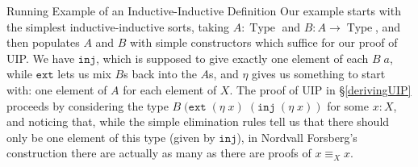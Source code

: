 \documentclass[runningheads]{llncs}
\newcommand{\erase}[1]{{}}
\DeclareMathOperator{\USet}{Type}
\newcommand{\IdA}[3]{{#1}\equiv_{#3}{#2}}
\newcommand{\join}{\texttt{ext}}
\newcommand{\inj}{\texttt{inj}}
\def\Forsberg/{Nordvall Forsberg}
\begin{document}
\begin{subsection}{\label{II-examples}Running Example of an Inductive-Inductive Definition}
Our example starts with the simplest inductive-inductive sorts, taking $A : \USet$ and $B : A \to \USet$, and then populates $A$ and $B$ with simple constructors which suffice for our proof of UIP. We have $\inj$, which is supposed to give exactly one element of each $B\;a$, while $\join$ lets us mix $B$s back into the $A$s\erase{ (mirroring the type of context extension)}, and $\eta$ gives us something to start with: one element of $A$ for each element of $X$\erase{ (following the use of $\eta$ in \citep[Example 3.3]{nordvallforsberg2013thesis})}. The proof of UIP in \S\ref{derivingUIP} proceeds by considering the type $B\;(\join\;(\eta\;x)\;(\inj\;(\eta\;x))$ for some $x : X$, and noticing that, while the simple elimination rules tell us that there should only be one element of this type (given by $\inj$), in \Forsberg/'s construction there are actually as many as there are proofs of $\IdA{x}{x}{X}$.


\end{subsection}
\end{document}
